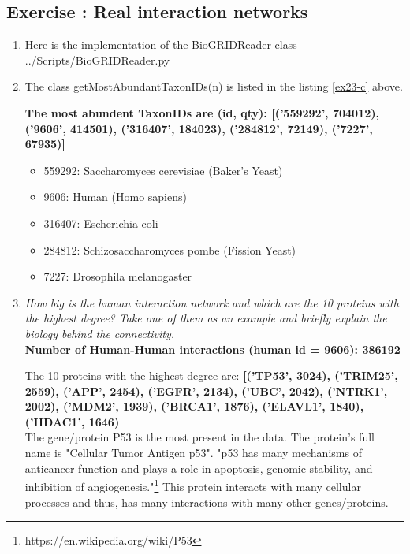 \documentclass[10pt,a4paper]{article}
\newcommand{\exercise}[1]
{
  \stepcounter{subsection}
  \subsection*{Exercise \thesubsection: #1}

}
\begin{document}
\newpage
\exercise{Real interaction networks}
\begin{enumerate}
	\item Here is the implementation of the BioGRIDReader-class
	 {../Scripts/BioGRIDReader.py}
	
	
	
	\newpage
	\item The class getMostAbundantTaxonIDs(n) is listed in the listing \ref{ex23-c} above. 
	
	\textbf{The most abundent TaxonIDs are (id, qty):  [('559292', 704012), ('9606', 414501), ('316407', 184023), ('284812', 72149), ('7227', 67935)]}
	
	\begin{itemize}
		\item 559292: Saccharomyces cerevisiae (Baker's Yeast)
		\item   9606: Human (Homo sapiens) 
		\item 316407: Escherichia coli
		\item 284812: Schizosaccharomyces pombe (Fission Yeast)
		\item   7227: Drosophila melanogaster
	\end{itemize}
	
	
	
	
	
	\item \textit{How big is the human interaction network and which are the 10 proteins with the highest
		degree? Take one of them as an example and briefly explain the biology behind the
		connectivity.}\\
	
	
	
	
	\textbf{Number of Human-Human interactions (human id = 9606):  386192}
	
	The  10  proteins with the highest degree are: 
	\textbf{[('TP53', 3024), ('TRIM25', 2559), ('APP', 2454), ('EGFR', 2134), ('UBC', 2042), ('NTRK1', 2002), ('MDM2', 1939), ('BRCA1', 1876), ('ELAVL1', 1840), ('HDAC1', 1646)]}\\
	
	
	The gene/protein P53 is the most present in the data. The protein's full name is "Cellular Tumor Antigen p53". "p53 has many mechanisms of anticancer function and plays a role in apoptosis, genomic stability, and inhibition of angiogenesis."\footnote{https://en.wikipedia.org/wiki/P53} This protein interacts with many cellular processes and thus, has many interactions with many other genes/proteins. 
	

\end{enumerate}
\end{document}
